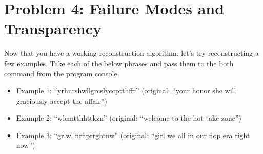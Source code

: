 \documentclass{article}
\theoremstyle{case}
\theoremstyle{definition}
\begin{document}
\newpage
\section*{Problem 4: Failure Modes and Transparency}
Now that you have a working reconstruction algorithm, let’s try reconstructing a few examples. Take each of the below phrases and pass them to the both command from the program console.
\begin{itemize}
\item Example 1: “yrhnrshwllgrcslyccptthffr” (original: “your honor she will graciously accept the affair”)
\item Example 2: “wlcmtthhttkzn” (original: “welcome to the hot take zone”)
\item Example 3: “grlwllnrflprrghtnw” (original: “girl we all in our flop era right now”)
\end{itemize}
\end{document}
